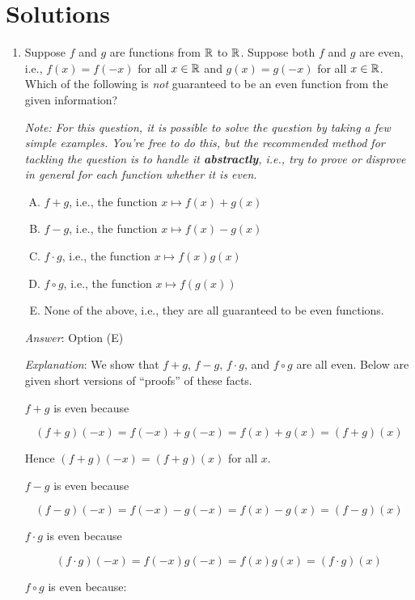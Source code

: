 \documentclass[10pt]{amsart}
\begin{document}
\section{Solutions}
\begin{enumerate}

\item Suppose $f$ and $g$ are functions from $\mathbb{R}$ to $\mathbb{R}$. Suppose
  both $f$ and $g$ are even, i.e., $f(x) = f(-x)$ for all $x \in \mathbb{R}$
  and $g(x) = g(-x)$ for all $x \in \mathbb{R}$. Which of the following is
  {\em not} guaranteed to be an even function from the given information?

  {\em Note: For this question, it is possible to solve the question
  by taking a few simple examples. You're free to do this, but the
  recommended method for tackling the question is to handle it {\bf
  abstractly}, i.e., try to prove or disprove in general for each
  function whether it is even.}

  \begin{enumerate}[(A)]
  \item $f + g$, i.e., the function $x \mapsto f(x) + g(x)$
  \item $f - g$, i.e., the function $x \mapsto f(x) - g(x)$
  \item $f \cdot g$, i.e., the function $x \mapsto f(x)g(x)$
  \item $f \circ g$, i.e., the function $x \mapsto f(g(x))$
  \item None of the above, i.e., they are all guaranteed to be even
    functions.
  \end{enumerate}

  {\em Answer}: Option (E)

  {\em Explanation}: We show that $f + g$, $f - g$, $f \cdot g$, and
  $f \circ g$ are all even. Below are given short versions of
  ``proofs'' of these facts.

  $f + g$ is even because 
  
  $$(f + g)(-x) = f(-x) + g(-x) = f(x) + g(x) = (f + g)(x)$$

  Hence $(f + g)(-x) = (f + g)(x)$ for all $x$.

  $f - g$ is even because

  $$(f - g)(-x) = f(-x) - g(-x) = f(x) - g(x) = (f - g)(x)$$

  $f \cdot g$ is even because

  $$(f \cdot g)(-x) = f(-x)g(-x) = f(x)g(x) = (f \cdot g)(x)$$

  $f \circ g$ is even because:


\end{enumerate}
\end{document}
